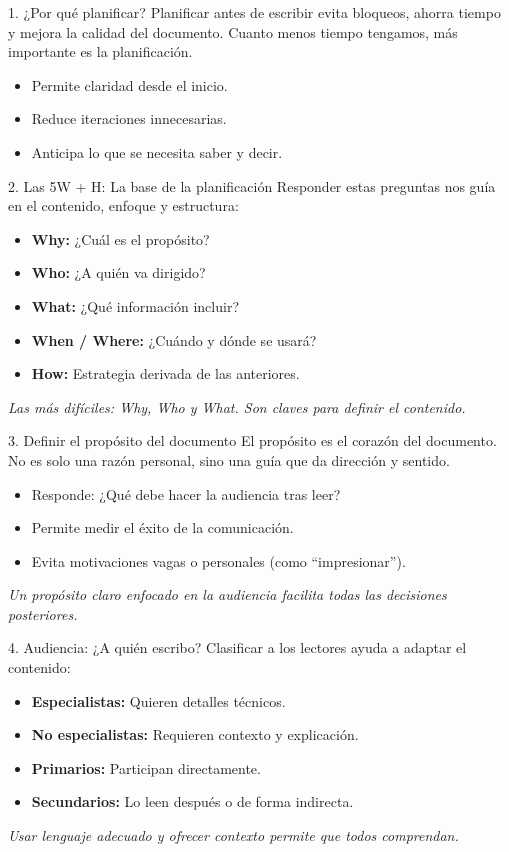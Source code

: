 \documentclass{beamer}
\begin{document}
\begin{frame}{1. ¿Por qué planificar?}
Planificar antes de escribir evita bloqueos, ahorra tiempo y mejora la calidad del documento. Cuanto menos tiempo tengamos, más importante es la planificación.
\begin{itemize}
    \item Permite claridad desde el inicio.
    \item Reduce iteraciones innecesarias.
    \item Anticipa lo que se necesita saber y decir.
\end{itemize}
\end{frame}
\begin{frame}{2. Las 5W + H: La base de la planificación}
Responder estas preguntas nos guía en el contenido, enfoque y estructura:
\begin{itemize}
    \item \textbf{Why:} ¿Cuál es el propósito?
    \item \textbf{Who:} ¿A quién va dirigido?
    \item \textbf{What:} ¿Qué información incluir?
    \item \textbf{When / Where:} ¿Cuándo y dónde se usará?
    \item \textbf{How:} Estrategia derivada de las anteriores.
\end{itemize}
\textit{Las más difíciles: Why, Who y What. Son claves para definir el contenido.}
\end{frame}
\begin{frame}{3. Definir el propósito del documento}
El propósito es el corazón del documento. No es solo una razón personal, sino una guía que da dirección y sentido.
\begin{itemize}
    \item Responde: ¿Qué debe hacer la audiencia tras leer?
    \item Permite medir el éxito de la comunicación.
    \item Evita motivaciones vagas o personales (como “impresionar”).
\end{itemize}
\textit{Un propósito claro enfocado en la audiencia facilita todas las decisiones posteriores.}
\end{frame}
\begin{frame}{4. Audiencia: ¿A quién escribo?}
Clasificar a los lectores ayuda a adaptar el contenido:
\begin{itemize}
    \item \textbf{Especialistas:} Quieren detalles técnicos.
    \item \textbf{No especialistas:} Requieren contexto y explicación.
    \item \textbf{Primarios:} Participan directamente.
    \item \textbf{Secundarios:} Lo leen después o de forma indirecta.
\end{itemize}
\textit{Usar lenguaje adecuado y ofrecer contexto permite que todos comprendan.}
\end{frame}
\end{document}
